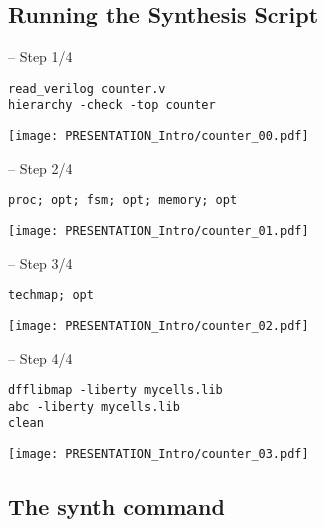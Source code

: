 
\subsection{Running the Synthesis Script}

\begin{frame}[t, fragile]{\subsecname{} -- Step 1/4}
\begin{verbatim}
read_verilog counter.v
hierarchy -check -top counter
\end{verbatim}

\vfill
\texttt{[image: PRESENTATION\_Intro/counter\_00.pdf]}
\end{frame}

\begin{frame}[t, fragile]{\subsecname{} -- Step 2/4}
\begin{verbatim}
proc; opt; fsm; opt; memory; opt
\end{verbatim}

\vfill
\texttt{[image: PRESENTATION\_Intro/counter\_01.pdf]}
\end{frame}

\begin{frame}[t, fragile]{\subsecname{} -- Step 3/4}
\begin{verbatim}
techmap; opt
\end{verbatim}

\vfill
\texttt{[image: PRESENTATION\_Intro/counter\_02.pdf]}
\end{frame}

\begin{frame}[t, fragile]{\subsecname{} -- Step 4/4}
\begin{verbatim}
dfflibmap -liberty mycells.lib
abc -liberty mycells.lib
clean
\end{verbatim}

\vfill\hfil
\texttt{[image: PRESENTATION\_Intro/counter\_03.pdf]}
\end{frame}


\subsection{The synth command}

